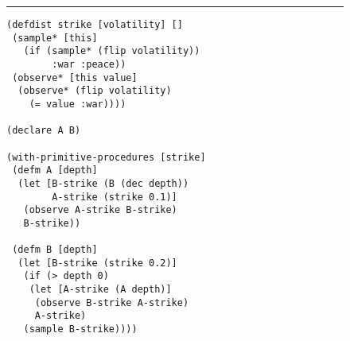 \begin{figure}[p]
		\centering	
		\vspace{-20pt}		
\rule{\linewidth}{0.4pt}
\vspace{-28pt}		
		\begin{lstlisting}[basicstyle=\ttfamily\footnotesize,multicols=2,frame=none]
(defdist strike [volatility] []
 (sample* [this] 
   (if (sample* (flip volatility)) 
        :war :peace))
 (observe* [this value] 
  (observe* (flip volatility) 
    (= value :war))))
  
(declare A B)

(with-primitive-procedures [strike]
 (defm A [depth]
  (let [B-strike (B (dec depth))
        A-strike (strike 0.1)]
   (observe A-strike B-strike)
   B-strike))
   
 (defm B [depth]
  (let [B-strike (strike 0.2)]
   (if (> depth 0)
    (let [A-strike (A depth)]
     (observe B-strike A-strike)
     A-strike)
   (sample B-strike))))


\end{lstlisting}
\end{figure}
